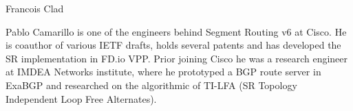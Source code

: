 \documentclass[10pt,journal,twocolumn]{IEEEtran}
\begin{document}
{\begin{IEEEbiography}{Francois Clad}
\end{IEEEbiography}
\begin{IEEEbiography}{Pablo Camarillo} is one of the engineers behind Segment Routing v6 at Cisco. He is coauthor of various IETF drafts, holds several patents and has developed the SR implementation in FD.io VPP. Prior joining Cisco he was a research engineer at IMDEA Networks institute, where he prototyped a BGP route server in ExaBGP and researched on the algorithmic of TI-LFA (SR Topology Independent Loop Free Alternates).
\end{IEEEbiography}}
\end{document}
